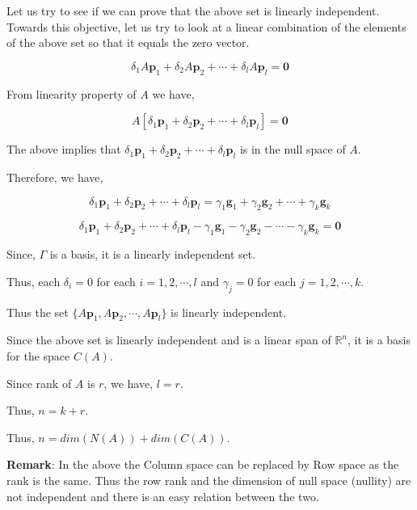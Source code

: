 \documentclass[a4paper]{article}
\begin{document}
Let us try to see if we can prove that the above set is linearly independent. Towards this objective, let us try to look at a linear combination of the elements of the above set so that it equals the zero vector.

\begin{equation}
\delta_1 A\boldsymbol{p}_1 + \delta_2 A\boldsymbol{p}_2 + \cdots + \delta_l A\boldsymbol{p}_l = \boldsymbol{0}
\end{equation}

From linearity property of $A$ we have,

\begin{equation}
A\left[\delta_1 \boldsymbol{p}_1 + \delta_2 \boldsymbol{p}_2 + \cdots + \delta_l \boldsymbol{p}_l \right]= \boldsymbol{0}
\end{equation}

The above implies that $\delta_1 \boldsymbol{p}_1 + \delta_2 \boldsymbol{p}_2 + \cdots + \delta_l \boldsymbol{p}_l$ is in the null space of $A$.

Therefore, we have,

\begin{equation}
\delta_1 \boldsymbol{p}_1 + \delta_2 \boldsymbol{p}_2 + \cdots + \delta_l \boldsymbol{p}_l = \gamma_1 \boldsymbol{g}_1 + \gamma_2 \boldsymbol{g}_2 + \cdots + \gamma_k \boldsymbol{g}_k
\end{equation}

\begin{equation}
\delta_1 \boldsymbol{p}_1 + \delta_2 \boldsymbol{p}_2 + \cdots + \delta_l \boldsymbol{p}_l - \gamma_1 \boldsymbol{g}_1 - \gamma_2 \boldsymbol{g}_2 - \cdots - \gamma_k \boldsymbol{g}_k = \boldsymbol{0}
\end{equation}

Since, $\Gamma$ is a basis, it is a linearly independent set.

Thus, each $\delta_i = 0$ for each $i=1,2, \cdots,l$ and $\gamma_j = 0$ for each $j = 1,2, \cdots, k$. 

Thus the set $\{ A\boldsymbol{p}_1, A\boldsymbol{p}_2, \cdots, A\boldsymbol{p}_l \}$ is linearly independent.

\bigskip

Since the above set is linearly independent and is a linear span of $\mathbb{R}^n$, it is a basis for the space $C(A)$.

Since rank of $A$ is $r$, we have, $l = r$.

Thus, $ n = k + r$.

Thus, $n = dim(N(A)) + dim(C(A))$.

\bigskip

\textbf{Remark}:
In the above the Column space can be replaced by Row space as the rank is the same. Thus the row rank and the dimension of null space (nullity) are not independent and there is an easy relation between the two.
\end{document}
